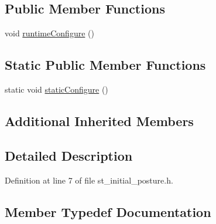 \subsection*{Public Member Functions}
\begin{DoxyCompactItemize}
\item 
void \hyperlink{structsm__moveit__4_1_1StInitialPosture_a0ba0a6fc206c11bfdd8d64594290b386}{runtime\+Configure} ()
\end{DoxyCompactItemize}
\subsection*{Static Public Member Functions}
\begin{DoxyCompactItemize}
\item 
static void \hyperlink{structsm__moveit__4_1_1StInitialPosture_a64aa9970704ab8c38a22cae53a5750df}{static\+Configure} ()
\end{DoxyCompactItemize}
\subsection*{Additional Inherited Members}


\subsection{Detailed Description}


Definition at line 7 of file st\+\_\+initial\+\_\+posture.\+h.



\subsection{Member Typedef Documentation}
\mbox{\label{structsm__moveit__4_1_1StInitialPosture_aba6b4f6994263b0b57c50986b9db3497}} 

